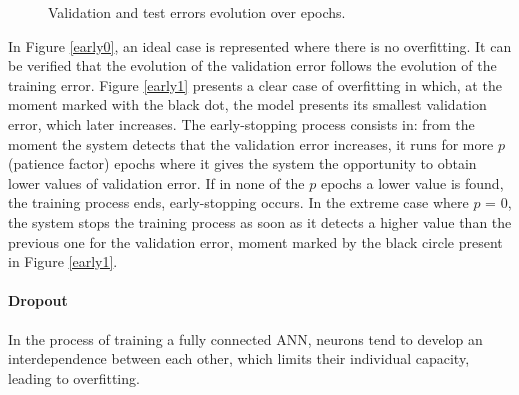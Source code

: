 \begin{figure}[h!]
\captionsetup[subfigure]{position=b}
\centering
{}
\hspace{0.05\textwidth}
\caption{Validation and test errors evolution over epochs.}
\label{early}
\end{figure}

In Figure \ref{early0}, an ideal case is represented where there is no overfitting. It can be verified that the evolution of the validation error follows the evolution of the training error. Figure \ref{early1} presents a clear case of overfitting in which, at the moment marked with the black dot, the model presents its smallest validation error, which later increases. The early-stopping process consists in: from the moment the system detects that the validation error increases, it runs for more $p$ (patience factor) epochs where it gives the system the opportunity to obtain lower values of validation error. If in none of the $p$ epochs a lower value is found, the training process ends, early-stopping occurs. In the extreme case where $p$ = 0, the system stops the training process as soon as it detects a higher value than the previous one for the validation error, moment marked by the black circle present in Figure \ref{early1}.

\paragraph*{Dropout}

In the process of training a fully connected \ac{ANN}, neurons tend to develop an interdependence between each other, which limits their individual capacity, leading to overfitting.


